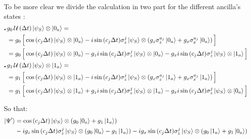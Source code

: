 \documentclass[a4paper,12pt]{article}
\begin{document}
	To be more clear we divide the calculation in two part for the different ancilla's states :
	\begin{align}
		\centerdot \, &g_{0} \, \mathcal{U} \left(\Delta t\right) \ket{\psi_S} \otimes \ket{0_a} = \notag \\
		&= g_{0} \, \Big[\cos{\left(c_j \Delta t \right)} \ket{\psi_S} \otimes \ket{0_a} -i \sin{\left(c_j \Delta t \right)} \sigma_{z}^{j} \ket{\psi_S} \otimes \left(g_z \sigma_{z}^{a_j} \ket{0_a} + g_x \sigma_{x}^{a_j} \ket{0_a} \right) \Big] \notag \\
		&=g_{0} \, \Big[\cos{\left(c_j \Delta t \right)} \ket{\psi_S} \otimes \ket{0_a} - g_z i \sin{\left(c_j \Delta t \right)} \sigma_{z}^{j} \ket{\psi_S} \otimes \ket{0_a} - g_x i \sin{\left(c_j \Delta t \right)} \sigma_{z}^{j} \ket{\psi_S} \otimes \ket{1_a}\Big] \notag \\
		\centerdot \, &g_{1} \, \mathcal{U} \left(\Delta t\right) \ket{\psi_S} \otimes \ket{1_a} = \notag \\
		&= g_{1} \, \Big[\cos{\left(c_j \Delta t \right)} \ket{\psi_S} \otimes \ket{1_a} -i \sin{\left(c_j \Delta t \right)} \sigma_{z}^{j} \ket{\psi_S} \otimes \left(g_z \sigma_{z}^{a_j} \ket{1_a} + g_x \sigma_{x}^{a_j} \ket{1_a} \right) \Big] \notag \\
		&=g_{1} \, \Big[\cos{\left(c_j \Delta t \right)} \ket{\psi_S} \otimes \ket{1_a} + g_z i \sin{\left(c_j \Delta t \right)} \sigma_{z}^{j} \ket{\psi_S} \otimes \ket{1_a} - g_x i \sin{\left(c_j \Delta t \right)} \sigma_{z}^{j} \ket{\psi_S} \otimes \ket{0_a}\Big] \notag
	\end{align}

	So that:
	\begin{align}
		\ket{\Psi'} &= \cos{\left(c_j \Delta t \right)} \ket{\psi_S} \otimes \left(g_0 \ket{0_a} + g_1 \ket{1_a}\right)
		\label{eq:comp_psi_evo_int} \\
		& - i g_z \sin{\left(c_j \Delta t \right)} \sigma_{z}^{j} \ket{\psi_S} \otimes \left(g_0 \ket{0_a} - g_1 \ket{1_a}\right) - i g_x \sin{\left(c_j \Delta t \right)} \sigma_{z}^{j} \ket{\psi_S} \otimes \left(g_0 \ket{1_a} + g_1 \ket{0_a}\right) \notag
	\end{align}
\end{document}
